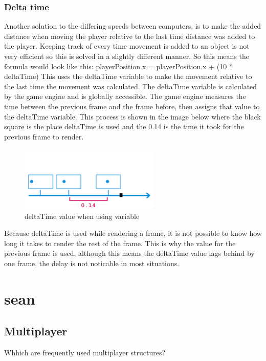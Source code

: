 \documentclass{article} %
\begin{document}
\subsubsection{Delta time}
Another solution to the differing speeds between computers, is to make the added distance when moving the player relative to the last time distance was added to the player.
Keeping track of every time movement is added to an object is not very efficient so this is solved in a slightly different manner.
So this means the formula would look like this:
\newline
playerPosition.x = playerPosition.x + (10 * deltaTime)
\newline
This uses the deltaTime variable to make the movement relative to the last time the movement was calculated.
\newline\newline
The deltaTime variable is calculated by the game engine and is globally accessible.
The game engine measures the time between the previous frame and the frame before, then assigns that value to the deltaTime variable.
This process is shown in the image below where the black square is the place deltaTime is used and the 0.14 is the time it took for the previous frame to render.
\begin{figure}[h!]
	\centering
	\includegraphics[width=0.6\textwidth]{used_deltatime_when_using_variable.png}
	\caption{deltaTime value when using variable}
\end{figure}
\newline
Because deltaTime is used while rendering a frame, it is not possible to know how long it takes to render the rest of the frame.
This is why the value for the previous frame is used, although this means the deltaTime value lags behind by one frame, the delay is not noticable in most situations.

\newpage
\section{sean}
\subsection{Multiplayer}
Whhich are frequently used multiplayer structures?
\end{document}
